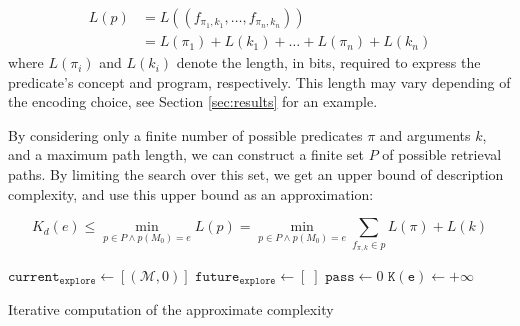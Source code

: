 \documentclass[entropy,article,submit,moreauthors,pdftex]{Definitions/mdpi}
\begin{document}
\begin{align}
    \label{eq:bit_lenght_p}
    L(p) & = L((f_{\pi_1,k_1}, \dots, f_{\pi_n, k_n}))     \\
         & = L(\pi_1) + L(k_1) + \dots + L(\pi_n) + L(k_n)
\end{align}
where $L(\pi_i)$ and $L(k_i)$ denote the length, in bits, required to express the predicate's concept and program, respectively. This length may vary depending of the encoding choice, see Section \ref{sec:results} for an example.

By considering only a finite number of possible predicates $\pi$ and arguments $k$, and a maximum path length, we can construct a finite set $P$ of possible retrieval paths. By limiting the search over this set, we get an upper bound of description complexity, and use this upper bound as an approximation:

\begin{equation}
    \label{eq:approx_k_desc}
    K_d(e) \leq \min_{p \in P \land p(M_0) = e} L(p) = \min_{p \in P \land p(M_0)=e} \sum_{f_{\pi, k} \in p} L(\pi) + L(k)
\end{equation}

\begin{algorithm}
    $\mathtt{current_{explore}} \leftarrow [(\mathcal{M}, 0)]$ \;
    $\mathtt{future_{explore} \leftarrow} [\;]$ \;
    $\mathtt{pass} \leftarrow 0$ \;
    $\mathtt{K(e)} \leftarrow +\infty$ \;
    \caption{Iterative computation of the approximate complexity}
    \label{alg:complex_iter}
\end{algorithm}
\end{document}

